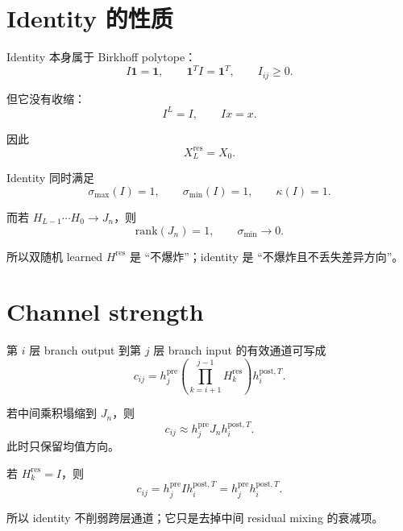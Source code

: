 \documentclass[UTF8,11pt]{ctexart}
\newcommand{\one}{\mathbf{1}}
\newcommand{\J}{J_n}
\newcommand{\Hres}{H^{\mathrm{res}}}
\begin{document}
\section{Identity 的性质}

Identity 本身属于 Birkhoff polytope：
\begin{equation}
  I\one=\one,
  \qquad
  \one^T I=\one^T,
  \qquad
  I_{ij}\ge0.
\end{equation}

但它没有收缩：
\begin{equation}
  I^L=I,
  \qquad
  Ix=x.
\end{equation}

因此
\begin{equation}
  X_L^{\mathrm{res}}=X_0.
\end{equation}

Identity 同时满足
\begin{equation}
  \sigma_{\max}(I)=1,
  \qquad
  \sigma_{\min}(I)=1,
  \qquad
  \kappa(I)=1.
\end{equation}

而若 $H_{L-1}\cdots H_0\to\J$，则
\begin{equation}
  \mathrm{rank}(\J)=1,
  \qquad
  \sigma_{\min}\to0.
\end{equation}

所以双随机 learned $\Hres$ 是 ``不爆炸''；identity 是 ``不爆炸且不丢失差异方向''。

\section{Channel strength}

第 $i$ 层 branch output 到第 $j$ 层 branch input 的有效通道可写成
\begin{equation}
  c_{ij}
  =
  h_j^{\mathrm{pre}}
  \left(\prod_{k=i+1}^{j-1}H_k^{\mathrm{res}}\right)
  h_i^{\mathrm{post},T}.
\end{equation}

若中间乘积塌缩到 $\J$，则
\begin{equation}
  c_{ij}
  \approx
  h_j^{\mathrm{pre}}\J h_i^{\mathrm{post},T}.
\end{equation}
此时只保留均值方向。

若 $H_k^{\mathrm{res}}=I$，则
\begin{equation}
  c_{ij}
  =
  h_j^{\mathrm{pre}} I h_i^{\mathrm{post},T}
  =
  h_j^{\mathrm{pre}}h_i^{\mathrm{post},T}.
\end{equation}

所以 identity 不削弱跨层通道；它只是去掉中间 residual mixing 的衰减项。
\end{document}
